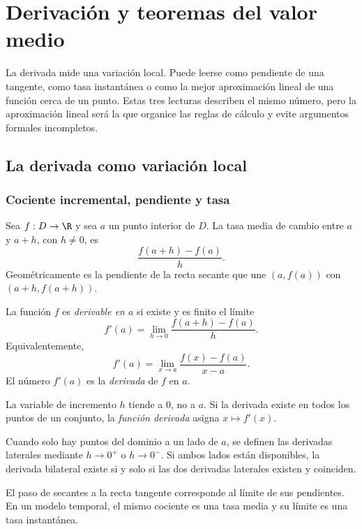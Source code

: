 \chapter{Derivación y teoremas del valor medio}
\label{chap:derivacion-valor-medio}

La derivada mide una variación local. Puede leerse como pendiente de una
tangente, como tasa instantánea o como la mejor aproximación lineal de una
función cerca de un punto. Estas tres lecturas describen el mismo número, pero
la aproximación lineal será la que organice las reglas de cálculo y evite
argumentos formales incompletos.

\section{La derivada como variación local}
\label{sec:derivada-variacion-local}

\subsection{Cociente incremental, pendiente y tasa}

Sea \(f:D\to\R\) y sea \(a\) un punto interior de \(D\). La tasa media de
cambio entre \(a\) y \(a+h\), con \(h\ne0\), es
\[
  \frac{f(a+h)-f(a)}{h}.
\]
Geométricamente es la pendiente de la recta secante que une
\((a,f(a))\) con \((a+h,f(a+h))\).

\begin{definicion}[Derivada]
La función \(f\) es \emph{derivable en \(a\)} si existe y es finito el límite
\[
  f'(a)=\lim_{h\to0}\frac{f(a+h)-f(a)}{h}.
\]
Equivalentemente,
\[
  f'(a)=\lim_{x\to a}\frac{f(x)-f(a)}{x-a}.
\]
El número \(f'(a)\) es la \emph{derivada} de \(f\) en \(a\).
\end{definicion}

La variable de incremento \(h\) tiende a \(0\), no a \(a\). Si la derivada
existe en todos los puntos de un conjunto, la \emph{función derivada} asigna
\(x\mapsto f'(x)\).

Cuando solo hay puntos del dominio a un lado de \(a\), se definen las
derivadas laterales mediante \(h\to0^+\) o \(h\to0^-\). Si ambos lados están
disponibles, la derivada bilateral existe si y solo si las dos derivadas
laterales existen y coinciden.

El paso de secantes a la recta tangente corresponde al límite de sus
pendientes. En un modelo temporal, el mismo cociente es una tasa media y su
límite es una tasa instantánea.

